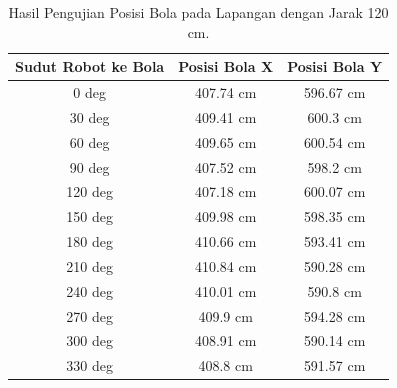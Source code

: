 \begin{table}[htbp]
  \caption{Hasil Pengujian Posisi Bola pada Lapangan dengan Jarak 120 cm.}
  \begin{center}
    \begin{tabular}{|c|c|c|}
      \hline
    \rowcolor[HTML]{C0C0C0}
  \textbf{Sudut Robot ke Bola} & \textbf{Posisi Bola X} & \textbf{Posisi Bola Y} \\
  \hline

  0 deg            & 407.74 cm                & 596.67 cm            \\
  30 deg           & 409.41 cm                & 600.3 cm            \\
  60 deg           & 409.65 cm                & 600.54 cm            \\
  90 deg           & 407.52 cm                & 598.2 cm           \\
  120 deg           & 407.18 cm                & 600.07 cm           \\
  150 deg           & 409.98 cm                & 598.35 cm           \\
  180 deg           & 410.66 cm                & 593.41 cm           \\
  210 deg           & 410.84 cm                & 590.28 cm           \\
  240 deg           & 410.01 cm                & 590.8 cm           \\
  270 deg           & 409.9 cm                & 594.28 cm           \\
  300 deg           & 408.91 cm                & 590.14 cm           \\
  330 deg           & 408.8 cm                & 591.57 cm           \\
  \hline
\end{tabular}
\end{center}
\end{table}

